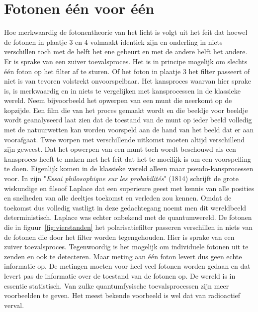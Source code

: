 {\section{Fotonen \'e\'en voor \'e\'en}
Hoe merkwaardig de fotonentheorie van het licht is volgt uit het feit dat hoewel de fotonen in plaatje 3 en 4 volmaakt identiek zijn en onderling in niets verschillen toch met de helft het ene gebeurt en met de andere helft het andere. Er is sprake van een zuiver toevalsproces. 
Het is in principe mogelijk om slechts \'e\'en foton op het filter af te sturen. Of het foton in plaatje 3 het filter passeert of niet is van tevoren volstrekt onvoorspelbaar. Het kansproces waarvan hier sprake is, is merkwaardig en in niets te vergelijken met kansprocessen in de klassieke wereld. Neem bijvoorbeeld het opwerpen van een munt die neerkomt op de kopzijde. Een film die van het proces gemaakt wordt en die beeldje voor beeldje wordt geanalyseerd laat zien dat de toestand van de munt op ieder beeld volledig met de natuurwetten kan worden voorspeld aan de hand van het beeld dat er aan voorafgaat. Twee worpen met verschillende uitkomst moeten altijd verschillend zijn geweest. Dat het opwerpen van een munt toch wordt beschouwd als een kansproces heeft te maken met het feit dat het te moeilijk is om een voorspelling te doen. Eigenlijk komen in de klassieke wereld alleen maar pseudo-kansprocessen voor.
In zijn "\textit{Essai philosophique sur les probabilit\'es}" (1814) schrijft de grote wiskundige en filsoof Laplace dat een superieure geest met kennis van alle posities en snelheden van alle deeltjes toekomst en verleden zou kennen. Omdat de toekomst dus volledig vastligt in deze gedachtegang noemt men dit wereldbeeld deterministisch. 
Laplace was echter onbekend met de quantumwereld. De fotonen die in figuur~\ref{fig:vierstanden} het polarisatiefilter passeren verschillen in niets van de fotonen die door het filter worden tegengehouden. Hier is sprake van een zuiver toevalsproces. Tegenwoordig is het mogelijk om individuele fotonen uit te zenden en ook te detecteren. Maar meting aan \'e\'en foton levert dus geen echte informatie op. De metingen moeten voor heel veel fotonen worden gedaan en dat levert pas de informatie over de toestand van de fotonen op. De wereld is in essentie statistisch.
Van zulke quantumfysische toevalsprocessen zijn meer voorbeelden te geven. Het meest bekende voorbeeld is wel dat van radioactief verval. 
}%

